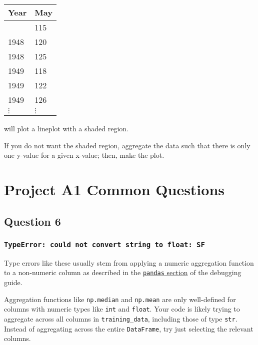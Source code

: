 \documentclass[
  letterpaper,
  DIV=11,
  numbers=noendperiod]{scrreprt}
\begin{document}
\begin{longtable}[]{@{}ll@{}}
\toprule\noalign{}
Year & May \\
\midrule\noalign{}
\endhead
\bottomrule\noalign{}
\endlastfoot
1948 & 115 \\
1948 & 120 \\
1948 & 125 \\
1949 & 118 \\
1949 & 122 \\
1949 & 126 \\
\(\vdots\) & \(\vdots\) \\
\end{longtable}

will plot a lineplot with a shaded region.

If you do not want the shaded region, aggregate the data such that there
is only one y-value for a given x-value; then, make the plot.


\chapter{Project A1 Common Questions}\label{project-a1-common-questions}

\section{Question 6}\label{question-6}

\subsection{\texorpdfstring{\texttt{TypeError:\ could\ not\ convert\ string\ to\ float:\ \textquotesingle{}SF\textquotesingle{}}}{TypeError: could not convert string to float: \textquotesingle SF\textquotesingle{}}}\label{typeerror-could-not-convert-string-to-float-sf}

Type errors like these usually stem from applying a numeric aggregation
function to a non-numeric column as described in the
\href{https://ds100.org/debugging-guide/pandas/pandas.html\#typeerror-could-not-convert-string-to-numeric}{\texttt{pandas}
section} of the debugging guide.

Aggregation functions like \texttt{np.median} and \texttt{np.mean} are
only well-defined for columns with numeric types like \texttt{int} and
\texttt{float}. Your code is likely trying to aggregate across all
columns in \texttt{training\_data}, including those of type
\texttt{str}. Instead of aggregating across the entire
\texttt{DataFrame}, try just selecting the relevant columns.
\end{document}
